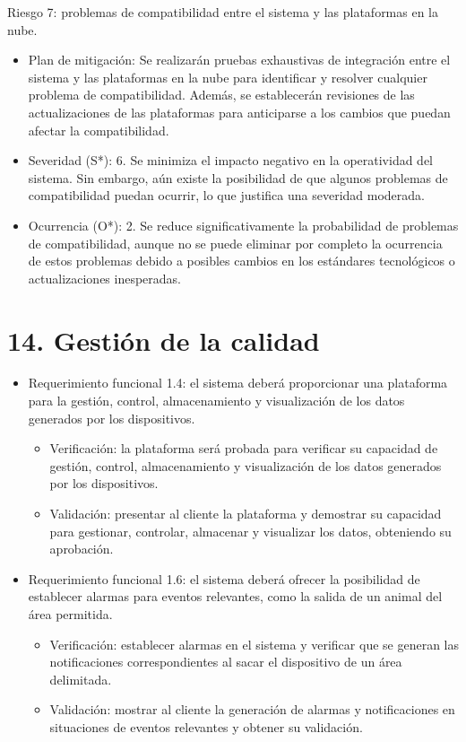 \documentclass[
11pt, %
]{charter}
\begin{document}
Riesgo 7: problemas de compatibilidad entre el sistema y las plataformas en la nube.
\begin{itemize}
    \item Plan de mitigación: Se realizarán pruebas exhaustivas de integración entre el sistema y las plataformas en la nube para identificar y resolver cualquier problema de compatibilidad. Además, se establecerán revisiones de las actualizaciones de las plataformas para anticiparse a los cambios que puedan afectar la compatibilidad. 
	\item Severidad (S*): 6. Se minimiza el impacto negativo en la operatividad del sistema. Sin embargo, aún existe la posibilidad de que algunos problemas de compatibilidad puedan ocurrir, lo que justifica una severidad moderada.
	\item Ocurrencia (O*): 2. Se reduce significativamente la probabilidad de problemas de compatibilidad, aunque no se puede eliminar por completo la ocurrencia de estos problemas debido a posibles cambios en los estándares tecnológicos o actualizaciones inesperadas.
\end{itemize}


\section{14. Gestión de la calidad}
\label{sec:calidad}

\begin{itemize}
\item Requerimiento funcional 1.4: el sistema deberá proporcionar una plataforma para la gestión, control, almacenamiento y visualización de los datos generados por los dispositivos.
\begin{itemize}
\item Verificación: la plataforma será probada para verificar su capacidad de gestión, control, almacenamiento y visualización de los datos generados por los dispositivos.
\item Validación: presentar al cliente la plataforma y demostrar su capacidad para gestionar, controlar, almacenar y visualizar los datos, obteniendo su aprobación.
\end{itemize}
\end{itemize}

\begin{itemize}
\item Requerimiento funcional 1.6: el sistema deberá ofrecer la posibilidad de establecer alarmas para eventos relevantes,
como la salida de un animal del área permitida.
\begin{itemize}
\item Verificación: establecer alarmas en el sistema y verificar que se generan las notificaciones correspondientes al sacar el dispositivo de un área delimitada.
\item Validación: mostrar al cliente la generación de alarmas y notificaciones en situaciones de eventos relevantes y obtener su validación.
\end{itemize}
\end{itemize}
\end{document}
